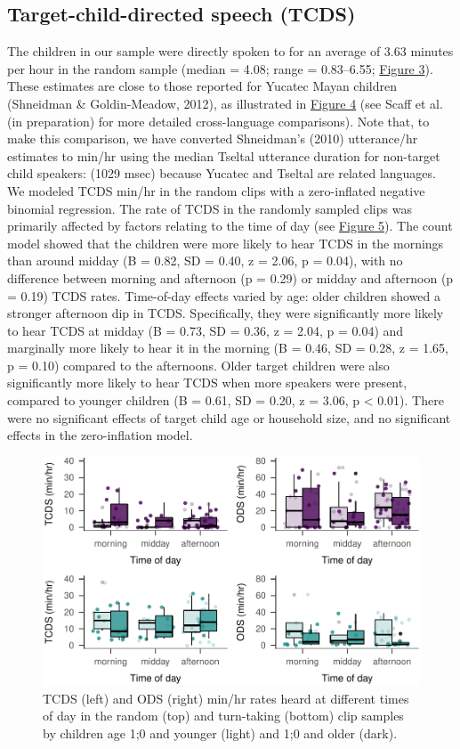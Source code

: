 \documentclass[floatsintext,man]{apa6}
\theoremstyle{definition}
\theoremstyle{definition}
\theoremstyle{definition}
\theoremstyle{remark}
\begin{document}
\subsection{Target-child-directed speech
(TCDS)}\label{target-child-directed-speech-tcds}

The children in our sample were directly spoken to for an average of
3.63 minutes per hour in the random sample (median = 4.08; range =
0.83--6.55; \protect\hyperlink{fig3}{Figure 3}). These estimates are
close to those reported for Yucatec Mayan children (Shneidman \&
Goldin-Meadow, 2012), as illustrated in \protect\hyperlink{fig4}{Figure
4} (see Scaff et al. (in preparation) for more detailed cross-language
comparisons). Note that, to make this comparison, we have converted
Shneidman's (2010) utterance/hr estimates to min/hr using the median
Tseltal utterance duration for non-target child speakers: (1029 msec)
because Yucatec and Tseltal are related languages. We modeled TCDS
min/hr in the random clips with a zero-inflated negative binomial
regression. The rate of TCDS in the randomly sampled clips was primarily
affected by factors relating to the time of day (see
\protect\hyperlink{fig5}{Figure 5}). The count model showed that the
children were more likely to hear TCDS in the mornings than around
midday (B = 0.82, SD = 0.40, z = 2.06, p = 0.04), with no difference
between morning and afternoon (p = 0.29) or midday and afternoon (p =
0.19) TCDS rates. Time-of-day effects varied by age: older children
showed a stronger afternoon dip in TCDS. Specifically, they were
significantly more likely to hear TCDS at midday (B = 0.73, SD = 0.36, z
= 2.04, p = 0.04) and marginally more likely to hear it in the morning
(B = 0.46, SD = 0.28, z = 1.65, p = 0.10) compared to the afternoons.
Older target children were also significantly more likely to hear TCDS
when more speakers were present, compared to younger children (B = 0.61,
SD = 0.20, z = 3.06, p \textless{} 0.01). There were no significant
effects of target child age or household size, and no significant
effects in the zero-inflation model.

\begin{figure}
\centering
\includegraphics{Tseltal-CLE_files/figure-latex/fig5-1.pdf}
\caption{\label{fig:fig5}TCDS (left) and ODS (right) min/hr rates heard at
different times of day in the random (top) and turn-taking (bottom) clip
samples by children age 1;0 and younger (light) and 1;0 and older
(dark).}
\end{figure}
\end{document}
